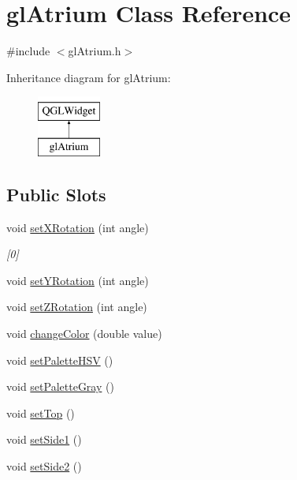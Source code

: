 \hypertarget{classgl_atrium}{\section{gl\+Atrium Class Reference}
\label{classgl_atrium}
}


{\ttfamily \#include $<$gl\+Atrium.\+h$>$}

Inheritance diagram for gl\+Atrium\+:\begin{figure}[H]
\begin{center}
\leavevmode
\includegraphics[height=2.000000cm]{classgl_atrium}
\end{center}
\end{figure}
\subsection*{Public Slots}
\begin{DoxyCompactItemize}
\item 
void \hyperlink{classgl_atrium_aa5afd6c2c43a3b9445e6821586671c36}{set\+X\+Rotation} (int angle)
\begin{DoxyCompactList}\small\item\em \mbox{[}0\mbox{]} \end{DoxyCompactList}\item 
void \hyperlink{classgl_atrium_a4b339e5080f2019dec3e916b4348f41c}{set\+Y\+Rotation} (int angle)
\item 
void \hyperlink{classgl_atrium_aab5b1212e320c13d3d3f30425f8e2028}{set\+Z\+Rotation} (int angle)
\item 
void \hyperlink{classgl_atrium_a1f31c083896df6adbcd619e2e3188625}{change\+Color} (double value)
\item 
void \hyperlink{classgl_atrium_a5a67ffc011f4545b7ecf4d8a745a6c06}{set\+Palette\+H\+S\+V} ()
\item 
void \hyperlink{classgl_atrium_acf6258aaf1d7c1a8cd7afe558bfd8fa4}{set\+Palette\+Gray} ()
\item 
void \hyperlink{classgl_atrium_adb2aa7af154e4d83ca976bd7042726aa}{set\+Top} ()
\item 
void \hyperlink{classgl_atrium_a1ea5edb0605ee17d77d636c81dbc74a9}{set\+Side1} ()
\item 
void \hyperlink{classgl_atrium_aab139e009363e2a027e4f3a5e3f1e84b}{set\+Side2} ()
\end{DoxyCompactItemize}
